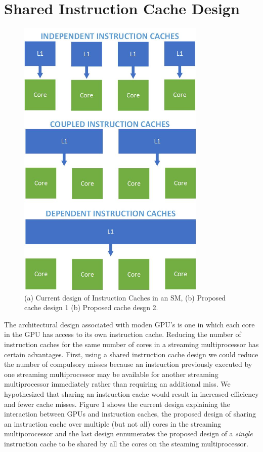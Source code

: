 \section{Shared Instruction Cache Design}

\begin{figure}[ht!]
\centering
\includegraphics[width=90mm]{InstructionCacheDesignSketches.jpg}
\caption{(a) Current design of Instruction Caches in an SM, (b) Proposed cache design 1 (b) Proposed cache desgn 2.}
\label{propDesign}
\end{figure}

The architectural design associated with moden GPU's is one in which each core in the GPU has access to its own instruction cache. Reducing the number of instruction caches for the same number of cores in a streaming multiprocessor has certain advantages. First, using a shared instruction cache design we could reduce the number of compulsory misses because an instruction previously executed by one streaming multiprocessor may be available for another streaming multiprocessor immediately rather than requiring an additional miss. We hypothesized that sharing an instruction cache would result in increased efficiency and fewer cache misses. Figure 1 shows the current design explaining the interaction between GPUs and instruction caches, the proposed design of sharing an instruction cache over multiple (but not all) cores in the streaming multiporocessor and the last design ennumerates the proposed design of a \emph{single} instruction cache to be shared by all the cores on the steaming multiprocessor. 




